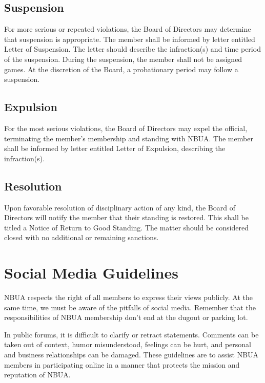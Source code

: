 \documentclass[letterpaper,11pt,colorlinks=true,allcolors=blue]{article}
\begin{document}
\subsection{Suspension}

For more serious or repeated violations, the Board of Directors may determine that suspension is appropriate.  The member shall be informed by letter entitled Letter of Suspension.  The letter should describe the infraction(s) and time period of the suspension.  During the suspension, the member shall not be assigned games.  At the discretion of the Board, a probationary period may follow a suspension.

\subsection{Expulsion}

For the most serious violations, the Board of Directors may expel the official, terminating the member’s membership and standing with NBUA.  The member shall be informed by letter entitled Letter of Expulsion, describing the infraction(s).

\subsection{Resolution}

Upon favorable resolution of disciplinary action of any kind, the Board of Directors will notify the member that their standing is restored.  This shall be titled a Notice of Return to Good Standing.  The matter should be considered closed with no additional or remaining sanctions.

\section{Social Media Guidelines}

NBUA respects the right of all members to express their views publicly. At the same time, we must be aware of the pitfalls of social media.  Remember that the responsibilities of NBUA membership don’t end at the dugout or parking lot.

In public forums, it is difficult to clarify or retract statements. Comments can be taken out of context, humor misunderstood, feelings can be hurt, and personal and business relationships can be damaged. These guidelines are to assist NBUA members in participating online in a manner that protects the mission and reputation of NBUA.
\end{document}
